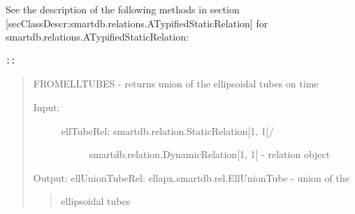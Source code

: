 \documentclass[letterpaper,10pt,english]{sphinxmanual}
\begin{document}
See the description of the following methods in section
{[}secClassDescr:smartdb.relations.ATypifiedStaticRelation{]} for
smartdb.relations.ATypifiedStaticRelation:

\begin{Verbatim}[commandchars=\\\{\}]
::
\end{Verbatim}
\begin{quote}

FROMELLTUBES - returns union of the ellipsoidal tubes on time
\begin{description}
\item[{Input:}] \leavevmode\begin{description}
\item[{ellTubeRel: smartdb.relation.StaticRelation{[}1, 1{]}/}] \leavevmode
smartdb.relation.DynamicRelation{[}1, 1{]} - relation
object

\end{description}

\end{description}

Output:
ellUnionTubeRel: ellapx.smartdb.rel.EllUnionTube - union of the
\begin{quote}

ellipsoidal tubes
\end{quote}
\end{quote}
\end{document}

